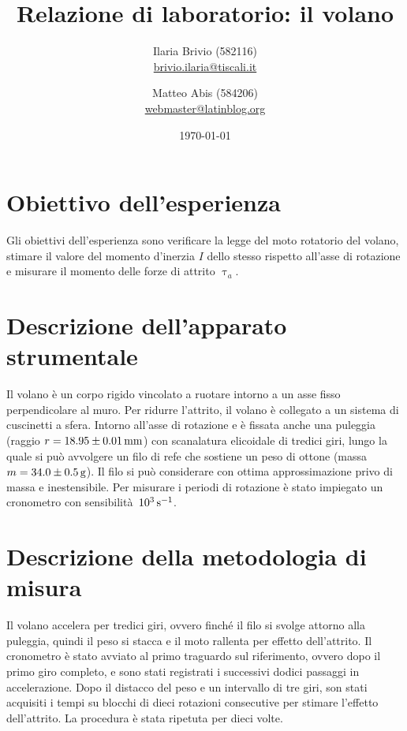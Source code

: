 \documentclass[italian,a4paper]{article}
\renewcommand{\tau}{\uptau} %
\begin{document}
\title{Relazione di laboratorio: il volano}
\author{\normalsize Ilaria Brivio (582116)\\%
\normalsize \url{brivio.ilaria@tiscali.it}%
\and %
\normalsize Matteo Abis (584206)\\ %
\normalsize \url{webmaster@latinblog.org}}
\date{\today}
\maketitle
\section{Obiettivo dell'esperienza}
Gli obiettivi dell'esperienza sono verificare la legge del moto rotatorio del volano, stimare il valore del momento d'inerzia $I$ dello stesso rispetto all'asse di rotazione e misurare il momento delle forze di attrito $\tau_a$.
\section{Descrizione dell'apparato strumentale}
Il volano è un corpo rigido vincolato a ruotare intorno a un asse fisso perpendicolare al muro. Per ridurre l'attrito, il volano è collegato a un sistema di cuscinetti a sfera. Intorno all'asse di rotazione  e è fissata anche una puleggia (raggio $r=\unit[18.95\pm0.01]{mm}$) con scanalatura elicoidale di tredici giri, lungo la quale si può avvolgere un filo di refe che sostiene un peso di ottone (massa $m=\unit[34.0\pm0.5]{g}$). Il filo si può considerare con ottima approssimazione privo di massa e inestensibile.
Per misurare i periodi di rotazione è stato impiegato un cronometro con sensibilità~$\unit[10^3]{s^{-1}}$.
\section{Descrizione della metodologia di misura}
Il volano accelera per tredici giri, ovvero finché il filo si svolge attorno alla puleggia, quindi il peso si stacca e il moto rallenta per effetto dell'attrito. Il cronometro è stato avviato al primo traguardo sul riferimento, ovvero dopo il primo giro completo, e sono stati registrati i successivi dodici passaggi in accelerazione. Dopo il distacco del peso e un intervallo di tre giri, son stati acquisiti i tempi su blocchi di dieci rotazioni consecutive per stimare l'effetto dell'attrito. La procedura è stata ripetuta per dieci volte.
\end{document}
